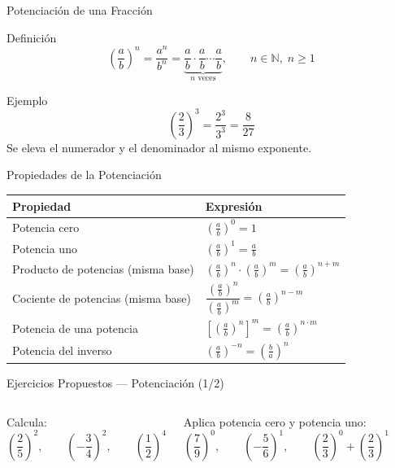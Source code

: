\documentclass[aspectratio=169]{beamer}
\begin{document}
\begin{frame}{Potenciación de una Fracción}
  \begin{block}{Definición}
    \[
      \left(\frac{a}{b}\right)^{n}
      = \frac{a^{n}}{b^{n}}
      = \underbrace{\frac{a}{b} \cdot \frac{a}{b} \cdots
        \frac{a}{b}}_{n \text{ veces}},
      \qquad n \in \mathbb{N},\; n \ge 1
    \]
  \end{block}
  \vspace{4pt}
  \begin{exampleblock}{Ejemplo}
    \[
      \left(\frac{2}{3}\right)^{3}
      = \frac{2^{3}}{3^{3}}
      = \frac{8}{27}
    \]
    Se eleva el numerador y el denominador al mismo exponente.
  \end{exampleblock}
\end{frame}

\begin{frame}{Propiedades de la Potenciación}
  \renewcommand{\arraystretch}{1.35}
  \begin{tabular}{@{} p{6.6cm} l @{}}
    \toprule
    \textbf{Propiedad} & \textbf{Expresión} \\
    \midrule
    Potencia cero &
      $\left(\frac{a}{b}\right)^{0} = 1$ \\
    Potencia uno &
      $\left(\frac{a}{b}\right)^{1} = \frac{a}{b}$ \\
    Producto de potencias (misma base) &
      $\left(\frac{a}{b}\right)^{n} \cdot
       \left(\frac{a}{b}\right)^{m}
       = \left(\frac{a}{b}\right)^{n+m}$ \\
    Cociente de potencias (misma base) &
      $\dfrac{\left(\frac{a}{b}\right)^{n}}
            {\left(\frac{a}{b}\right)^{m}}
       = \left(\frac{a}{b}\right)^{n-m}$ \\
    Potencia de una potencia &
      $\left[\left(\frac{a}{b}\right)^{n}\right]^{m}
       = \left(\frac{a}{b}\right)^{n \cdot m}$ \\
    Potencia del inverso &
      $\left(\frac{a}{b}\right)^{-n}
       = \left(\frac{b}{a}\right)^{n}$ \\
    \bottomrule
  \end{tabular}
\end{frame}

\begin{frame}{Ejercicios Propuestos — Potenciación \textnormal{(1/2)}}
  \begin{columns}[T]
    \begin{mwejercicio}
      Calcula:
      \[
        \left(\frac{2}{5}\right)^{2},
        \qquad
        \left(-\frac{3}{4}\right)^{2},
        \qquad
        \left(\frac{1}{2}\right)^{4}
      \]
    \end{mwejercicio}
    \begin{mwejercicio}
      Aplica potencia cero y potencia uno:
      \[
        \left(\frac{7}{9}\right)^{0},
        \qquad
        \left(-\frac{5}{6}\right)^{1},
        \qquad
        \left(\frac{2}{3}\right)^{0} +
        \left(\frac{2}{3}\right)^{1}
      \]
    \end{mwejercicio}
  \end{columns}
\end{frame}
\end{document}

